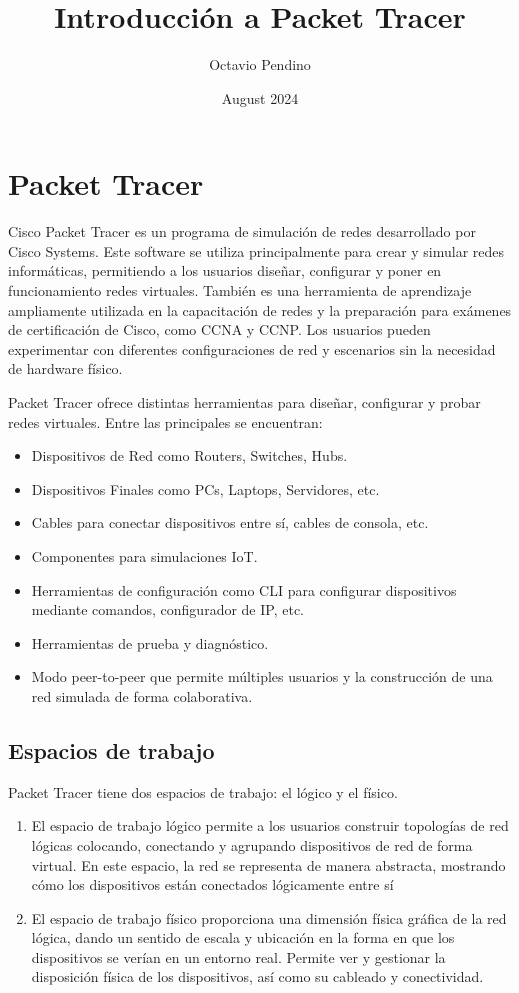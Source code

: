 \documentclass{article}
\title{Introducción a Packet Tracer}
\author{Octavio Pendino}
\date{August 2024}
\begin{document}
\maketitle

\section{Packet Tracer}
Cisco Packet Tracer es un programa de simulación de redes desarrollado por Cisco Systems. Este software se utiliza principalmente para crear y simular redes informáticas, permitiendo a los usuarios diseñar, configurar y poner en funcionamiento redes virtuales. También es una herramienta de aprendizaje ampliamente utilizada en la capacitación de redes y la preparación para exámenes de certificación de Cisco, como CCNA y CCNP. Los usuarios pueden experimentar con diferentes configuraciones de red y escenarios sin la necesidad de hardware físico.

    Packet Tracer ofrece distintas herramientas para diseñar, configurar y probar redes virtuales. Entre las principales se encuentran:
    \begin{itemize}
        \item Dispositivos de Red como Routers, Switches, Hubs.
        \item Dispositivos Finales como PCs, Laptops, Servidores, etc.
        \item Cables para conectar dispositivos entre sí, cables de consola, etc.
        \item Componentes para simulaciones IoT.
        \item Herramientas de configuración como CLI para configurar dispositivos mediante comandos, configurador de IP, etc.
        \item Herramientas de prueba y diagnóstico.
        \item Modo peer-to-peer que permite múltiples usuarios y la construcción de una red simulada de forma colaborativa.
    \end{itemize}

\subsection{Espacios de trabajo}
     Packet Tracer tiene dos espacios de trabajo: el lógico y el físico. 
     \begin{enumerate}
         \item El espacio de trabajo lógico permite a los usuarios construir topologías de red lógicas colocando, conectando y agrupando dispositivos de red de forma virtual. En este espacio, la red se representa de manera abstracta, mostrando cómo los dispositivos están conectados lógicamente entre sí
         \item El espacio de trabajo físico proporciona una dimensión física gráfica de la red lógica, dando un sentido de escala y ubicación en la forma en que los dispositivos se verían en un entorno real. Permite ver y gestionar la disposición física de los dispositivos, así como su cableado y conectividad. 
     \end{enumerate}
\end{document}
